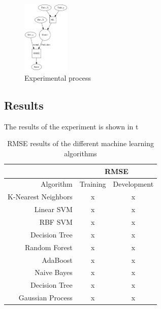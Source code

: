 \documentclass{article}
\begin{document}
	\begin{figure} [h]
 		\begin{center}
		\includegraphics[width=0.20\textwidth]{process}
  		\end{center}
  		\caption{Experimental process}
  		\label{process}
 	\end{figure}

	\subsection{Results}
	The results of the experiment is shown in t

	\begin{table}
		\begin{center}
			\begin{tabular}{ | r | c | c |}
			\hline
			& \multicolumn{2}{c|}{RMSE} \\ \hline
			Algorithm & Training & Development \\ \hline\hline
			K-Nearest Neighbors        & x & x \\ \hline
			Linear SVM                 & x & x \\ \hline
			RBF SVM                    & x & x \\ \hline
			Decision Tree              & x & x \\ \hline
			Random Forest              & x & x \\ \hline
			AdaBoost                   & x & x \\ \hline
			Naive Bayes                & x & x \\ \hline
			Decision Tree              & x & x \\ \hline
			Gaussian Process           & x & x \\ \hline
			\end{tabular}
		\end{center}
		\caption{RMSE results of the different machine learning algorithms}
		\label{rmse_results}
	\end{table}
 
\end{document}
